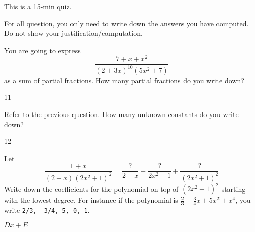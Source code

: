 

\renewcommand\AUTHOR{nweadick1@cougars.ccis.edu} %


\topmattertwo

This is a 15-min quiz.

For all question, you only need to write down the answers you have
computed. Do not show your justification/computation.

\nextq
You are going to express
\[
\frac{7 + x + x^2}{(2 + 3x)^{10}(5x^2 + 7)}
\]
as a sum of partial fractions.
How many partial fractions do you write down?
\\
\ANSWER
\begin{answerlong}
11
\end{answerlong}

\nextq
Refer to the previous question. 
How many unknown constants do you write down?
\\
\ANSWER
\begin{answerlong}
12
\end{answerlong}

\nextq
Let
\[
\frac{1 + x}{(2 + x) (2x^2 + 1)^2} = \frac{?}{2+x} + \frac{?}{2x^2 + 1} + \frac{?}{(2x^2 + 1)^2}
\]
Write down the coefficients for the polynomial on top of $(2x^2 + 1)^2$
starting with the lowest degree.
For instance if the polynomial is
$\frac{2}{3} - \frac{3}{4}x + 5x^2 + x^4$, you write \verb!2/3, -3/4, 5, 0, 1!.
\\
\ANSWER
\begin{answerlong}
$Dx+E$
\end{answerlong}


\newpage


